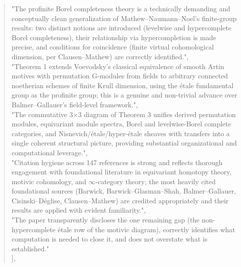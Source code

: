 \documentclass[11pt]{article}
\begin{document}
\begin{quote}
    "The profinite Borel completeness theory is a technically demanding and conceptually clean generalization of Mathew--Naumann--Noel's finite-group results: two distinct notions are introduced (levelwise and hypercomplete Borel completeness), their relationship via hypercompletion is made precise, and conditions for coincidence (finite virtual cohomological dimension, per Clausen--Mathew) are correctly identified.",\\
    "Theorem 1 extends Voevodsky's classical equivalence of smooth Artin motives with permutation G-modules from fields to arbitrary connected noetherian schemes of finite Krull dimension, using the étale fundamental group as the profinite group; this is a genuine and non-trivial advance over Balmer--Gallauer's field-level framework.",\\
    "The commutative 3\ensuremath{\times}3 diagram of Theorem 3 unifies derived permutation modules, equivariant module spectra, Borel and levelwise-Borel complete categories, and Nisnevich/étale/hyper-étale sheaves with transfers into a single coherent structural picture, providing substantial organizational and computational leverage.",\\
    "Citation hygiene across 147 references is strong and reflects thorough engagement with foundational literature in equivariant homotopy theory, motivic cohomology, and \ensuremath{\infty}-category theory; the most heavily cited foundational sources (Barwick, Barwick--Glasman--Shah, Balmer--Gallauer, Cisinski--Déglise, Clausen--Mathew) are credited appropriately and their results are applied with evident familiarity.",\\
    "The paper transparently discloses the one remaining gap (the non-hypercomplete étale row of the motivic diagram), correctly identifies what computation is needed to close it, and does not overstate what is established."\\
  ],\\

\end{quote}
\end{document}
